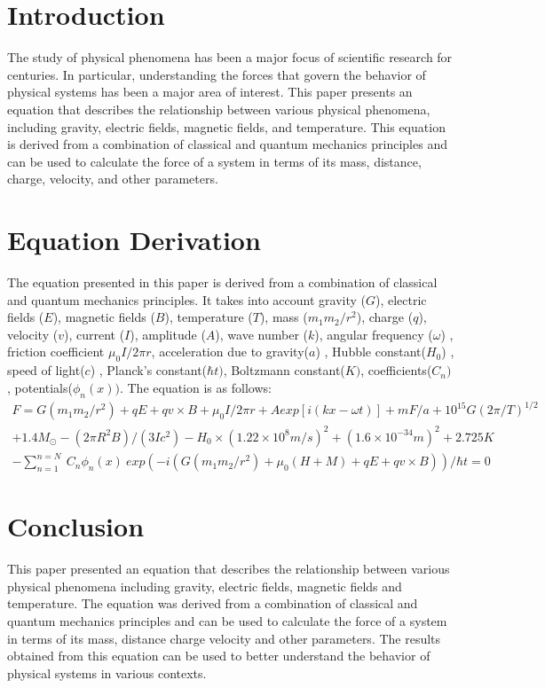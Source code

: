 \documentclass[12pt, a4paper]{article}
\begin{document}
    \section*{Introduction}

    The study of physical phenomena has been a major focus of scientific research for centuries. 
  In particular, understanding the forces that govern the behavior of physical systems has been a major 
  area of interest. This paper presents an equation that describes the relationship between various physical 
  phenomena, including gravity, electric fields, magnetic fields, and temperature. This equation is derived 
  from a combination of classical and quantum mechanics principles and can be used to calculate the force of 
  a system in terms of its mass, distance, charge, velocity, and other parameters. 

    \section*{Equation Derivation} 
    The equation presented in this paper is derived from a combination of classical and quantum mechanics 
  principles. It takes into account gravity ($G$), electric fields ($E$), magnetic fields ($B$), temperature ($T$), 
  mass ($m_1m_2/r^2$), charge ($q$), velocity ($v$), current ($I$), amplitude ($A$), wave number ($k$), angular 
  frequency ($\omega$) , friction coefficient $\mu_0I/2\pi r$, acceleration due to gravity($a$) , Hubble 
  constant($H_0$) , speed of light($c$) , Planck's constant($\hbar t)$, Boltzmann constant($K)$, coefficients($C_n)$, 
  potentials($\phi_n(x))$. 
  The equation is as follows:
  \begin{multline*}
  F = G(m_1m_2/r^2) + qE + qv \times B + \mu_0I/2\pi r + Aexp[i(kx-\omega t)] + mF/a + 10^{15} G (2\pi/T)^{1/2} \\
  + 1.4M_{\odot} - (2\pi R^2B)/(3Ic^2) - H_0 \times (1.22 \times 10^8 m/s)^2 + (1.6 \times 10^{-34} m)^2 + 2.725 K \\
  - \sum_{n=1}^{n=N}\ C_n \phi_n(x)\ exp(-i(G(m_{1}m_{2}/r^2)+ \mu_{0}(H+M)+ qE+ qv \times B))/{\hbar t = 0}
   \end{multline*}

    \section*{Conclusion}

    This paper presented an equation that describes the relationship between various physical phenomena including 
  gravity, electric fields, magnetic fields and temperature. The equation was derived from a combination of classical 
  and quantum mechanics principles and can be used to calculate the force of a system in terms of its mass, distance 
  charge velocity and other parameters. The results obtained from this equation can be used to better understand the 
  behavior of physical systems in various contexts.


     
\end{document}
